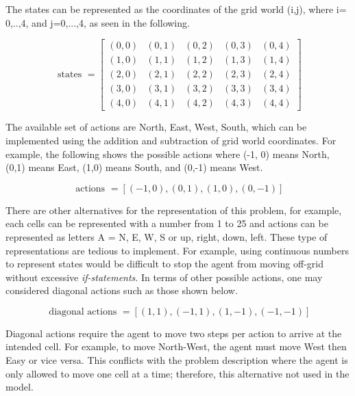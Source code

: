 \documentclass[11pt]{article}
\begin{document}
\noindent
The states can be represented as the coordinates of the grid world (i,j), where i=
0,..,4, and j=0,...,4, as seen in the following.

\begin{equation}
\text { states }=\left[\begin{array}{lllll}
{(0,0)} & {(0,1)} & {(0,2)} & {(0,3)} & {(0,4)} \\
{(1,0)} & {(1,1)} & {(1,2)} & {(1,3)} & {(1,4)} \\
{(2,0)} & {(2,1)} & {(2,2)} & {(2,3)} & {(2,4)} \\
{(3,0)} & {(3,1)} & {(3,2)} & {(3,3)} & {(3,4)} \\
{(4,0)} & {(4,1)} & {(4,2)} & {(4,3)} & {(4,4)}
\end{array}\right]
\end{equation}


\noindent
The available set of actions are North, East, West, South, which can be implemented
using the addition and subtraction of grid world coordinates. For example, the following
shows the possible actions where (-1, 0) means North, (0,1) means East, (1,0) means South,
and (0,-1) means West.

\begin{equation}
\text { actions }=[(-1,0),(0,1),(1,0),(0,-1)]
\end{equation}

\noindent
There are other alternatives for the representation of this problem, for
example, each cells can be represented with a number from 1 to 25 and actions
can be represented as letters A = {N, E, W, S} or {up, right, down, left}. These
type of representations are tedious to implement. For example, using continuous
numbers to represent states would be difficult to stop the agent from moving
off-grid without excessive \textit{if-statements}. In terms of other possible
actions, one may considered diagonal actions such as those shown below.

\begin{equation}
\text { diagonal actions }=[(1,1),(-1,1),(1,-1),(-1,-1)]
\end{equation}

\noindent
Diagonal actions require the agent to move two steps per action to arrive at the
intended cell. For example, to move North-West, the agent must move West then
Easy or vice versa. This conflicts with the problem description where the agent
is only allowed to move one cell at a time; therefore, this alternative  not
used in the model. \\
\end{document}
